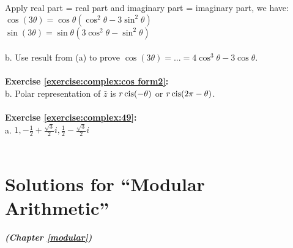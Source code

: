 Apply real part = real part and imaginary part = imaginary part, we have:\\
$\cos(3\theta)=\cos\theta(\cos^{2}\theta-3\sin^{2}\theta)$\\
$\sin(3\theta)=\sin\theta(3\cos^{2}\theta-\sin^{2}\theta)$\\
\\
b. Use result from (a) to prove $\cos(3\theta)=...=4\cos^{3}\theta-3\cos\theta $.\\
\\
\textbf{Exercise \ref{exercise:complex:cos form2}:}\\
b. Polar representation of $\bar{z}$ is $r\operatorname{cis}(-\theta)$ or $r\operatorname{cis}(2\pi-\theta)$.\\
\\
\textbf{Exercise \ref{exercise:complex:49}:}\\
a. $1, -\displaystyle\frac{1}{2}+\displaystyle\frac{\sqrt{3}}{2}i, \displaystyle\frac{1}{2}-\displaystyle\frac{\sqrt{3}}{2}i$\\
\\

\section{Solutions for ``Modular Arithmetic''}
\noindent \textbf{\textit{ (Chapter \ref{modular})}}\bigskip

